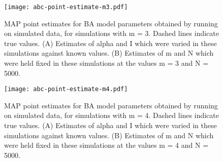 \clearpage


\begin{figure}[ht]
  \centering
  \texttt{[image: abc-point-estimate-m3.pdf]}
  \caption[
    \Acrlong{MAP} point estimates for \gls{BA} model parameters obtained by
    running  on simulated data, for simulations with \gls{m} = 3.
  ]{
    \Acrlong{MAP} point estimates for \gls{BA} model parameters obtained by
    running  on simulated data, for simulations with \gls{m} = 3.
    Dashed lines indicate true values. (A) Estimates of \gls{alpha} and \gls{I}
    which were varied in these simulations against known values. (B) Estimates
    of \gls{m} and \gls{N} which were held fixed in these simulations at the
    values \gls{m} = 3 and \gls{N} = 5000.
  }        
  \label{fig:abcptm3}
\end{figure}

\begin{figure}[ht]
  \centering
  \texttt{[image: abc-point-estimate-m4.pdf]}
  \caption[
    \Acrlong{MAP} point estimates for \gls{BA} model parameters obtained by
    running  on simulated data, for simulations with \gls{m} = 3.
  ]{
    \Acrlong{MAP} point estimates for \gls{BA} model parameters obtained by
    running  on simulated data, for simulations with \gls{m} = 4.
    Dashed lines indicate true values. (A) Estimates of \gls{alpha} and \gls{I}
    which were varied in these simulations against known values. (B) Estimates
    of \gls{m} and \gls{N} which were held fixed in these simulations at the
    values \gls{m} = 4 and \gls{N} = 5000.
  }        
  \label{fig:abcptm4}
\end{figure}

